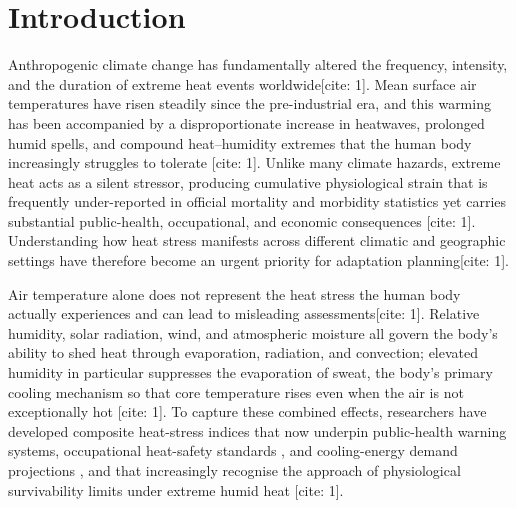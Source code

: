 \documentclass[pdflatex,sn-mathphys-ay]{sn-jnl}
\begin{document}

\maketitle

\section{Introduction}\label{sec:intro}
Anthropogenic climate change has fundamentally altered the frequency, intensity, and the duration of extreme heat events worldwide[cite: 1]. Mean surface air temperatures have risen steadily since the pre-industrial era, and this warming has been accompanied by a disproportionate increase in heatwaves, prolonged humid spells, and compound heat--humidity extremes that the human body increasingly struggles to tolerate \citep{Shaw2022IPCCAsia}[cite: 1]. Unlike many climate hazards, extreme heat acts as a silent stressor, producing cumulative physiological strain that is frequently under-reported in official mortality and morbidity statistics yet carries substantial public-health, occupational, and economic consequences \citep{Kjellstrom2019}[cite: 1]. Understanding how heat stress manifests across different climatic and geographic settings have therefore become an urgent priority for adaptation planning[cite: 1].

Air temperature alone does not represent the heat stress the human body actually experiences and can lead to misleading assessments[cite: 1]. Relative humidity, solar radiation, wind, and atmospheric moisture all govern the body's ability to shed heat through evaporation, radiation, and convection; elevated humidity in particular suppresses the evaporation of sweat, the body's primary cooling mechanism so that core temperature rises even when the air is not exceptionally hot \citep{steadman1979}[cite: 1]. To capture these combined effects, researchers have developed composite heat-stress indices that now underpin public-health warning systems, occupational heat-safety standards \citep{iso7243_2017}, and cooling-energy demand projections \citep{spinoni2018}, and that increasingly recognise the approach of physiological survivability limits under extreme humid heat \citep{raymond2020}[cite: 1].
\end{document}
